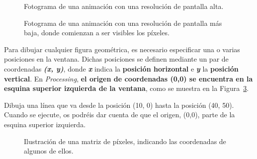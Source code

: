 \documentclass[
  spanish,
  11pt,
  a4paper,
  DIV=11,
  numbers=noendperiod]{scrartcl}
\begin{document}
\begin{figure}

\caption{\label{fig-highres}Fotograma de una animación con una resolución de pantalla alta.}

\end{figure}%

\begin{figure}

\caption{\label{fig-lowres}Fotograma de una animación con una resolución de pantalla más baja, donde comienzan a ser visibles los píxeles.}

\end{figure}%

Para dibujar cualquier figura geométrica, es necesario especificar una o varias posiciones en la ventana. Dichas posiciones se definen mediante un par de coordenadas \textbf{\emph{(x, y)}}, donde \textbf{\emph{x}} indica la \textbf{posición horizontal} e \textbf{\emph{y}} la \textbf{posición vertical}. En \emph{Processing}, \textbf{el origen de coordenadas (0,0) se encuentra en la esquina superior izquierda de la ventana}, como se muestra en la Figura~\ref{fig-pixels}.

\begin{tcolorbox}[enhanced jigsaw, toprule=.15mm, coltitle=black, titlerule=0mm, opacitybacktitle=0.6, breakable, colback=white, colframe=quarto-callout-note-color-frame, colbacktitle=quarto-callout-note-color!10!white, opacityback=0, title={Ejercicio 1 - Sistema de coordenadas}, bottomtitle=1mm, rightrule=.15mm, toptitle=1mm, left=2mm, bottomrule=.15mm, leftrule=.75mm, arc=.35mm]

Dibuja una línea que va desde la posición (10, 0) hasta la posición (40, 50). Cuando se ejecute, os podréis dar cuenta de que el origen, (0,0), parte de la esquina superior izquierda.


\end{tcolorbox}

\begin{figure}

\caption{\label{fig-pixels}Ilustración de una matriz de píxeles, indicando las coordenadas de algunos de ellos.}

\end{figure}%
\end{document}
